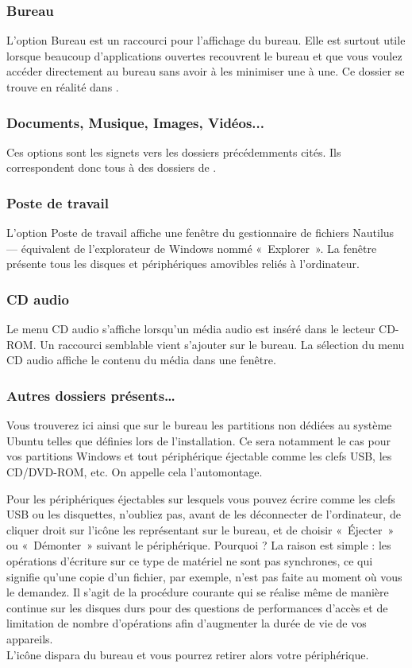 \subsubsection{Bureau}
L'option Bureau est un raccourci pour l'affichage du bureau. Elle est surtout utile lorsque beaucoup d'applications ouvertes recouvrent le bureau et que vous voulez accéder directement au bureau sans avoir à les minimiser une à une. Ce dossier se trouve en réalité dans .
\subsubsection{Documents, Musique, Images, Vidéos...}
Ces options sont les signets vers les dossiers précédemments cités. Ils correspondent donc tous à des dossiers de .
\subsubsection{Poste de travail}
L'option Poste de travail affiche une fenêtre du gestionnaire de fichiers Nautilus --- équivalent  de l'explorateur de Windows nommé «~Explorer~». La fenêtre présente tous les disques et périphériques amovibles reliés à l'ordinateur. 
\subsubsection{CD audio}
Le menu CD audio s'affiche lorsqu'un média audio est inséré dans le lecteur CD-ROM. Un raccourci semblable vient s'ajouter sur le bureau. La sélection du menu CD audio affiche le contenu du média dans une fenêtre. 
\subsubsection{Autres dossiers présents\ldots{}}
\label{AutrePartitions}
Vous trouverez ici ainsi que sur le bureau les partitions non dédiées au système Ubuntu telles que définies lors de l'installation. Ce sera notamment le cas pour vos partitions Windows et tout périphérique éjectable comme les clefs USB, les CD/DVD-ROM, etc. On appelle cela l'automontage.\par
Pour les périphériques éjectables sur lesquels vous pouvez écrire comme les clefs USB ou les disquettes, n'oubliez pas, avant de les déconnecter de l'ordinateur, de cliquer droit sur l'icône les représentant sur le bureau, et de choisir «~Éjecter~» ou «~Démonter~» suivant le périphérique. Pourquoi ? La raison est simple : les opérations d'écriture sur ce type de matériel ne sont pas synchrones, ce qui signifie qu'une copie d'un fichier, par exemple, n'est pas faite au moment où vous le demandez. Il s'agit de la procédure courante qui se réalise même de manière continue sur les disques durs pour des questions de performances d'accès et de limitation de nombre d'opérations afin d'augmenter la durée de vie de vos appareils.\\
L'icône dispara du bureau et vous pourrez retirer alors votre périphérique.
